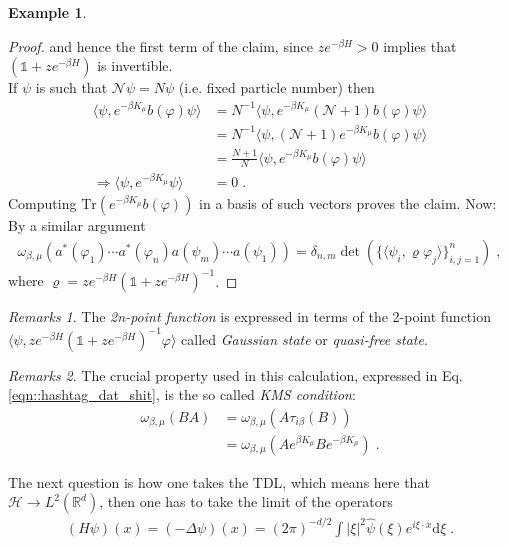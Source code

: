 \documentclass[
a4paper, %
11pt, %
onecolumn, %
openany, %
]{memoir}
\theoremstyle{definition}
\newtheorem{example}{Example}[chapter]
\theoremstyle{remark}
\newtheorem{remarks}{Remarks}[chapter]
\theoremstyle{plain}
\begin{document}
\begin{example}
\begin{proof}
	and hence the first term of the claim, since $ze^{-\beta H}>0$ implies that $(\mathds{1}+ze^{-\beta H})$ is invertible.\\
	If $\psi$ is such that $\mathcal{N}\psi= N\psi$ (i.e. fixed particle number) then \begin{align}
	\langle \psi,e^{-\beta K_{\mu}}b(\varphi)\psi\rangle &={N}^{-1}\langle \psi , e^{-\beta K_{\mu}}(\mathcal{N}+1)b(\varphi)\psi\rangle\\
	&= N^{-1}\langle \psi, (\mathcal{N}+1)e^{-\beta K_{\mu}}b(\varphi)\psi\rangle\\
	&=\frac{N+1}{N}\langle \psi, e^{-\beta K_{\mu}}b(\varphi)\psi\rangle\\
	\Rightarrow \langle \psi,e^{-\beta K_{\mu}}\psi\rangle&=0\; .
	\end{align}
	Computing $\mathrm{Tr}(e^{-\beta K_{\mu}}b(\varphi))$ in a basis of such vectors proves the claim. Now: By a similar argument \begin{align}
	\omega_{\beta,\mu}(a^*(\varphi_1)\cdots a^{*}(\varphi_n)a(\psi_m)\cdots a(\psi_1))=\delta_{n,m}\det\left(\{\langle\psi_i,\varrho\varphi_j\rangle\}_{i,j=1}^{n}\right)\; ,	\end{align}
$\text{where }\varrho = ze^{-\beta H}(\mathds{1}+ze^{-\beta H})^{-1}$.
\end{proof}
\end{example}
\begin{remarks}
	The \textit{2n-point function} is expressed in terms of the 2-point function $\langle \psi, ze^{-\beta H}(\mathds{1}+ze^{-\beta H})^{-1}\varphi\rangle$ called \textit{Gaussian state} or \textit{quasi-free state}.
\end{remarks}
\begin{remarks}
	The crucial property used in this calculation, expressed in Eq. \eqref{eqn::hashtag_dat_shit}, is the so called \textit{KMS condition}: \begin{align}
	\omega_{\beta,\mu}(BA)&=\omega_{\beta,\mu}(A\tau_{i\beta}(B))\\
	&=\omega_{\beta,\mu}(Ae^{\beta K_{\mu}}Be^{-\beta K_{\mu}})\; .
	\end{align}
\end{remarks}
The next question is how one takes the TDL, which means here that $\mathcal{H}\rightarrow L^2(\mathbb{R}^d)$, then one has to take the limit of the operators \begin{align}
(H\psi)(x)=(-\Delta \psi)(x)=(2\pi)^{-d/2}\int |\xi|^2\hat{\psi}(\xi)e^{i\xi\cdot x}\mathrm{d}\xi\; .
\end{align}
\end{document}
